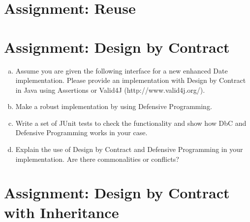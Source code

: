 \documentclass[a4paper,12pt,oneside]{scrreprt}
\newcommand*{\sourcepath}{../code/src/main/java/de/rwth/swc/group10}
\begin{document}
\setcounter{chapter}{1} %
\section{Assignment: Reuse}

%



\section{Assignment: Design by Contract}


\begin{enumerate}[a)]
	\item Assume you are given the following interface for a new enhanced Date
	implementation. Please provide an implementation with Design by Contract in Java 	using Assertions or Valid4J (http://www.valid4j.org/).\\
	
	\vspace{2em}
	
	
	\item Make a robust implementation by using Defensive Programming.
	
	\item  Write a set of JUnit tests to check the functionality and show how DbC and Defensive Programming works in your case.
	
	\item Explain the use of Design by Contract and Defensive Programming in your
	implementation. Are there commonalities or conflicts?
\end{enumerate}

\section{Assignment: Design by Contract with Inheritance}
\end{document}
